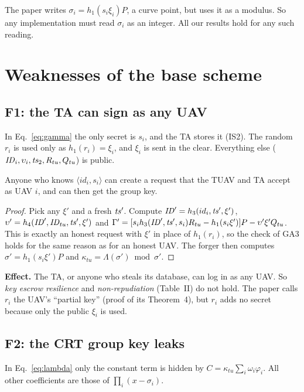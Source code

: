 \documentclass[11pt,openany]{report}
\begin{document}
\begin{remark}
The paper writes $\sigma_i=h_1(s_i\xi_i)P$, a curve point, but uses it as a modulus. So any implementation must read $\sigma_i$ as an integer. All our
results hold for any such reading.
\end{remark}

\chapter{Weaknesses of the base scheme}\label{ch:flaws}
\section{F1: the TA can sign as any UAV}
In Eq.~\eqref{eq:gamma} the only secret is $s_i$, and the TA stores it (IS2). The random $r_i$ is used only as $h_1(r_i)=\xi_i$, and $\xi_i$ is sent in
the clear. Everything else ($\mathit{ID}_i,\upsilon_i,\mathit{ts}_2,R_{tu},Q_{tu}$) is public.

\begin{theorem}[TA forgery]\label{thm:f1}
Anyone who knows $\langle id_i,s_i\rangle$ can create a request that the TUAV and TA accept as UAV $i$, and can then get the group key.
\end{theorem}
\begin{proof}
Pick any $\xi'$ and a fresh $\mathit{ts}'$. Compute $\mathit{ID}'=h_3(id_i,\mathit{ts}',\xi')$, $\upsilon'=h_4(\mathit{ID}',\mathit{ID}_{tu},\mathit{ts}',\xi')$ and
$\Gamma'=[s_i h_3(\mathit{ID}',\mathit{ts}',s_i)R_{tu}-h_1(s_i\xi')]P-\upsilon'\xi'Q_{tu}$. This is exactly an honest request with $\xi'$ in place of $h_1(r_i)$, so the
check of GA3 holds for the same reason as for an honest UAV. The forger then computes $\sigma'=h_1(s_i\xi')P$ and $\kappa_{tu}=\Lambda(\sigma')\bmod\sigma'$.
\end{proof}

\textbf{Effect.} The TA, or anyone who steals its database, can log in as any UAV. So \emph{key escrow resilience} and \emph{non-repudiation} (Table~II)
do not hold. The paper calls $r_i$ the UAV's ``partial key'' (proof of its Theorem~4), but $r_i$ adds no secret because only the public $\xi_i$ is used.

\section{F2: the CRT group key leaks}
In Eq.~\eqref{eq:lambda} only the constant term is hidden by $C=\kappa_{tu}\sum_i\omega_i\varphi_i$. All other coefficients are those of
$\prod_i(x-\sigma_i)$.
\end{document}
